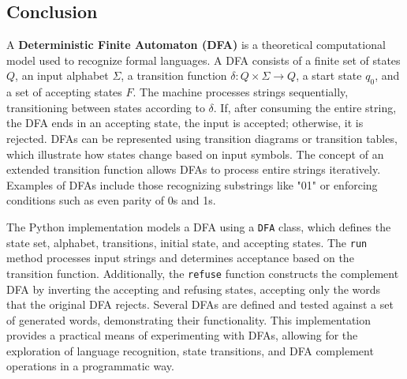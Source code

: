 \documentclass{article}
\begin{document}
\begin{center}
\end{center}

\subsection{Conclusion}

A \textbf{Deterministic Finite Automaton (DFA)} is a theoretical computational model used to recognize formal languages. A DFA consists of a finite set of states \( Q \), an input alphabet \( \Sigma \), a transition function \( \delta: Q \times \Sigma \to Q \), a start state \( q_0 \), and a set of accepting states \( F \). The machine processes strings sequentially, transitioning between states according to \( \delta \). If, after consuming the entire string, the DFA ends in an accepting state, the input is accepted; otherwise, it is rejected. DFAs can be represented using transition diagrams or transition tables, which illustrate how states change based on input symbols. The concept of an extended transition function allows DFAs to process entire strings iteratively. Examples of DFAs include those recognizing substrings like "01" or enforcing conditions such as even parity of 0s and 1s.

The Python implementation models a DFA using a \texttt{DFA} class, which defines the state set, alphabet, transitions, initial state, and accepting states. The \texttt{run} method processes input strings and determines acceptance based on the transition function. Additionally, the \texttt{refuse} function constructs the complement DFA by inverting the accepting and refusing states, accepting only the words that the original DFA rejects. Several DFAs are defined and tested against a set of generated words, demonstrating their functionality. This implementation provides a practical means of experimenting with DFAs, allowing for the exploration of language recognition, state transitions, and DFA complement operations in a programmatic way.
\end{document}
